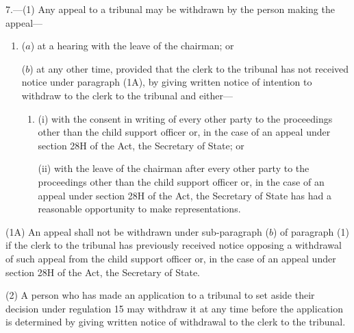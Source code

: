 \documentclass[a4paper]{article}
\begin{document}
7.—(1) Any appeal to a tribunal may be withdrawn by the person making the appeal---
\begin{enumerate}\item[]
($a$) at a hearing with the leave of the chairman; or

%

($b$) at any other time, provided that the clerk to the tribunal has not received notice under paragraph (1A), by giving written notice of intention to withdraw to the clerk to the tribunal and either—
\begin{enumerate}\item[]
(i) with the consent in writing of every other party to the proceedings other than the child support officer
or, in the case of an appeal under section 28H of the Act, the Secretary of State; %
or

(ii) with the leave of the chairman after every other party to the proceedings other than the child support officer 
or, in the case of an appeal under section 28H of the Act, the Secretary of State %
has had a reasonable opportunity to make representations.
\end{enumerate}
\end{enumerate}

(1A) An appeal shall not be withdrawn under sub-paragraph ($b$) of paragraph (1) if the clerk to the tribunal has previously received notice opposing a withdrawal of such appeal from the child support officer
or, in the case of an appeal under section 28H of the Act,
the Secretary of State.  %

(2) A person who has made an application to a tribunal to set aside their decision under regulation 15 may withdraw it at any time before the application is determined by giving written notice of withdrawal to the clerk to the tribunal.
\end{document}
